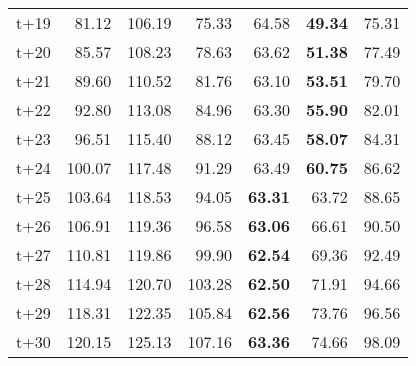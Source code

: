 \begin{table}[H]
\begin{tabular}{lrrrrrr}
t+19  & 81.12  & 106.19  & 75.33  & 64.58  & \textbf{49.34}  & 75.31  \\
t+20  & 85.57  & 108.23  & 78.63  & 63.62  & \textbf{51.38}  & 77.49  \\
t+21  & 89.60  & 110.52  & 81.76  & 63.10  & \textbf{53.51}  & 79.70  \\
t+22  & 92.80  & 113.08  & 84.96  & 63.30  & \textbf{55.90}  & 82.01  \\
t+23  & 96.51  & 115.40  & 88.12  & 63.45  & \textbf{58.07}  & 84.31  \\
t+24  & 100.07  & 117.48  & 91.29  & 63.49  & \textbf{60.75}  & 86.62  \\
t+25  & 103.64  & 118.53  & 94.05  & \textbf{63.31}  & 63.72  & 88.65  \\
t+26  & 106.91  & 119.36  & 96.58  & \textbf{63.06}  & 66.61  & 90.50  \\
t+27  & 110.81  & 119.86  & 99.90  & \textbf{62.54}  & 69.36  & 92.49  \\
t+28  & 114.94  & 120.70  & 103.28  & \textbf{62.50}  & 71.91  & 94.66  \\
t+29  & 118.31  & 122.35  & 105.84  & \textbf{62.56}  & 73.76  & 96.56  \\
t+30  & 120.15  & 125.13  & 107.16  & \textbf{63.36}  & 74.66  & 98.09  \\

\bottomrule
\end{tabular}
\end{table}
